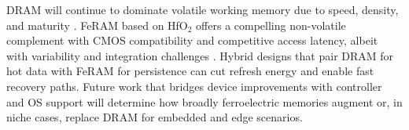 DRAM will continue to dominate volatile working memory due to speed, density, and maturity \cite{choi2022,kim2021_dram}. FeRAM based on HfO$_2$ offers a compelling non-volatile complement with CMOS compatibility and competitive access latency, albeit with variability and integration challenges \cite{noheda2023}. Hybrid designs that pair DRAM for hot data with FeRAM for persistence can cut refresh energy and enable fast recovery paths. Future work that bridges device improvements with controller and OS support will determine how broadly ferroelectric memories augment or, in niche cases, replace DRAM for embedded and edge scenarios.
